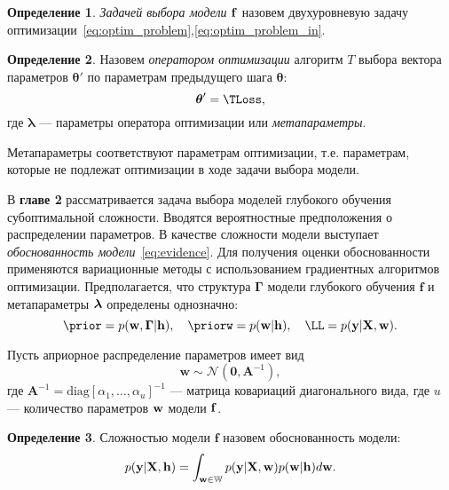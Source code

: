 \documentclass[11pt, a5paper]{dissert}
\theoremstyle{definition}
\newtheorem{defin}{Определение}
\begin{document}
\begin{defin}
\textit{Задачей выбора модели} $\mathbf{f}$ назовем   двухуровневую задачу оптимизации~\eqref{eq:optim_problem},\eqref{eq:optim_problem_in}.
\end{defin}

\begin{defin} Назовем \textit{оператором оптимизации} алгоритм $T$ выбора вектора параметров $\boldsymbol{\theta}'$  по параметрам предыдущего шага $\boldsymbol{\theta}$:
\begin{equation}
\label{eq:optim_operator}
	\teta' = \TLoss,
\end{equation}
где $\boldsymbol{\lambda}$ --- параметры оператора оптимизации или \textit{метапараметры}.
\end{defin}
Метапараметры соответствуют параметрам оптимизации, т.е. параметрам, которые не подлежат оптимизации в ходе задачи выбора модели. 


В \textbf{главе 2} рассматривается задача выбора моделей глубокого обучения субоптимальной сложности. Вводятся вероятностные предположения о распределении параметров. В качестве сложности модели выступает \textit{обоснованность модели}~\eqref{eq:evidence}. Для получения оценки обоснованности применяются вариационные методы с использованием градиентных алгоритмов оптимизации. 
Предполагается, что структура  $\boldsymbol{\Gamma}$  модели глубокого обучения $\mathbf{f}$  и метапараметры $\boldsymbol{\lambda}$ определены однозначно:
\begin{equation}
\label{eq:workaround}
    \prior = p(\w,\G|\h), \quad \priorw = p(\w|\h),\quad    \LL = p(\y|\X,\w).
\end{equation}


Пусть априорное распределение параметров имеет вид
\begin{equation}
\label{eq:prior}
	\mathbf{w} \sim \mathcal{N}(\mathbf{0}, \mathbf{A}^{-1}),
\end{equation}
где $\mathbf{A}^{-1} = \text{diag}[\alpha_1, \dots, \alpha_u]^{-1}$ --- матрица ковариаций диагонального вида, где $u$ --- количество параметров $\mathbf{w}$ модели $\mathbf{f}$. 



\begin{defin} Сложностью модели $\mathbf{f}$ назовем обоснованность модели:
\begin{equation}
\label{eq:model_evidence}
	p(\mathbf{y}|\mathbf{X},\mathbf{h}) = \int_{\mathbf{w} \in \mathbb{W}} p(\mathbf{y}|\mathbf{X},\mathbf{w})p(\mathbf{w}|\mathbf{h})d\mathbf{w}.
\end{equation}
\end{defin}
\end{document}
